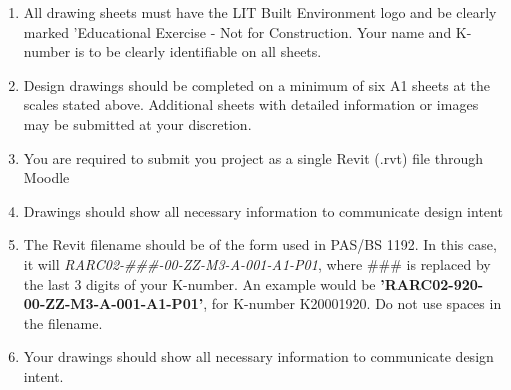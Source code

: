 \begin{enumerate}
	\item All drawing sheets must have the LIT Built Environment logo and be clearly marked 'Educational Exercise - Not for Construction.  Your name and K-number is to be clearly identifiable on all sheets.
	\item Design drawings should be completed on a minimum of six A1 sheets at the scales stated above.  Additional sheets with detailed information or images may be submitted at your discretion.
	\item You are required to submit you project as a single Revit (.rvt) file through Moodle
	\item Drawings should show all necessary information to communicate design intent
	\item The Revit filename should be of the form used in PAS/BS 1192.  In this case, it will \textit{RARC02-\#\#\#-00-ZZ-M3-A-001-A1-P01}, where \#\#\# is replaced by the last 3 digits of your K-number. An example would be \textbf{'RARC02-920-00-ZZ-M3-A-001-A1-P01'}, for K-number K20001920.  Do not use spaces in the filename.
	\item Your drawings should show all necessary information to communicate design intent. 
\end{enumerate}

